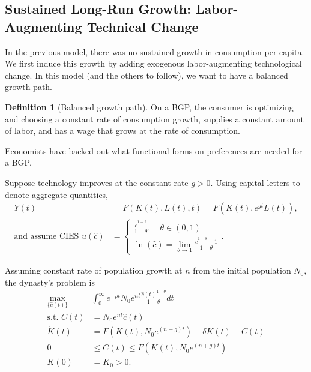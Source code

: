 \documentclass{tufte-handout}
\theoremstyle{definition}
\newtheorem{defn}[thm]{Definition}
\begin{document}
\subsection{Sustained Long-Run Growth: Labor-Augmenting Technical Change}

In the previous model, there was no sustained growth in consumption per capita. We first induce this growth by adding exogenous labor-augmenting technological change. In this model (and the others to follow), we want to have a balanced growth path.

\begin{defn}[Balanced growth path]
	On a BGP, the consumer is optimizing and choosing a constant rate of consumption growth, supplies a constant amount of labor, and has a wage that grows at the rate of consumption.
\end{defn}

Economists have backed out what functional forms on preferences are needed for a BGP.

Suppose technology improves at the constant rate $g > 0$. Using capital letters to denote aggregate quantities,
\begin{align*}
	Y(t) &= F(K(t),L(t),t) = F(K(t),e^{gt}L(t)) , \\
	\text{and assume CIES } u(\hat{c}) &= \begin{cases}
		\frac{\hat{c}^{1-\theta}}{1-\theta}, \quad \theta \in (0,1) \\
		\ln{(\hat{c})} = \lim\limits_{\theta \to 1} \frac{\hat{c}^{1-\theta} - 1}{1-\theta} 
	\end{cases}.
\end{align*}

Assuming constant rate of population growth at $n$ from the initial population $N_0$, the dynasty's problem is
\begin{align*}
	\max_{\{\hat{c}(t)\}} &\int_{0}^{\infty} e^{-\rho t} N_0 e^{nt} \frac{\hat{c}(t)^{1-\theta}}{1-\theta} dt \\
		\text{s.t. } C(t) &= N_0 e^{nt} \hat{c}(t) \\
		\dot{K}(t) &= F\left( K(t), N_0 e^{\left( n+g \right)t} \right) - \delta K(t) - C(t) \\
		0 &\le C(t) \le F\left( K(t), N_0 e^{\left( n+g \right)t}\right) \\
		K(0) &= K_0 > 0
.\end{align*}
\end{document}
